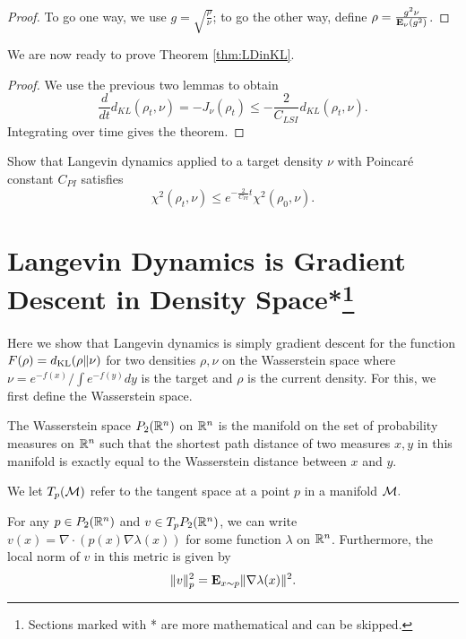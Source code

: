 \begin{proof}
To go one way, we use $g=\sqrt{\frac{\rho}{\nu}}$; to go the other
way, define $\rho=\frac{g^{2}\nu}{\mathbf{E}_{\nu}(g^{2})}$.
\end{proof}
We are now ready to prove Theorem \ref{thm:LDinKL}.
\begin{proof}
We use the previous two lemmas to obtain
\[
\frac{d}{dt}d_{KL}(\rho_{t},\nu)=-J_{\nu}(\rho_{t})\le-\frac{2}{C_{LSI}}d_{KL}(\rho_{t},\nu).
\]
Integrating over time gives the theorem.
\end{proof}
\begin{xca}
Show that Langevin dynamics applied to a target density $\nu$ with
Poincar\'e constant $C_{PI}$ satisfies 
\[
\chi^{2}(\rho_{t},\nu)\le e^{-\frac{2}{C_{PI}}t}\chi^{2}(\rho_{0},\nu).
\]
\end{xca}

\section{Langevin Dynamics is Gradient Descent in Density Space*\footnote{Sections marked with * are more mathematical and can be skipped.}}\label{sec:LD_GD}

Here we show that Langevin dynamics is simply gradient descent for
the function $F(\rho)=d_{\mathrm{KL}}(\rho\|\nu)$ for two densities $\rho,\nu$
on the Wasserstein space where $\nu=e^{-f(x)}/\int e^{-f(y)}dy$ is
the target and $\rho$ is the current density. For this, we first
define the Wasserstein space.
\begin{defn}
The Wasserstein space $P_{2}(\mathbb{R}^{n})$ on $\mathbb{R}^{n}$ is the manifold on the
set of probability measures on $\mathbb{R}^{n}$ such that the shortest path
distance of two measures $x,y$ in this manifold is exactly equal
to the Wasserstein distance between $x$ and $y$.

We let $T_{p}({\cal M})$ refer to the tangent space at a point $p$
in a manifold ${\cal M}.$
\end{defn}

\begin{lem}
\label{lem:local-norm}For any $p\in P_{2}(\mathbb{R}^{n})$ and $v\in T_{p}P_{2}(\mathbb{R}^{n})$,
we can write $v(x)=\nabla\cdot(p(x)\nabla\lambda(x))$ for some function
$\lambda$ on $\mathbb{R}^{n}$. Furthermore, the local norm of $v$ in this
metric is given by
\[
\|v\|^{2}_{p}=\mathbf{E}_{x\sim p}\|\nabla\lambda(x)\|^{2}.
\]
\end{lem}

